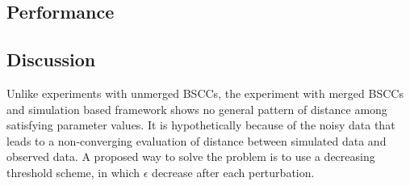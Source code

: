 \subsection{Performance}

\subsection{Discussion}
Unlike experiments with unmerged BSCCs, the experiment with merged BSCCs and simulation based
framework shows no general pattern of distance among satisfying parameter values. It is
hypothetically because of the noisy data that leads to a non-converging evaluation of distance
between simulated data and observed data. A proposed way to solve the problem is to use a decreasing
threshold scheme, in which $\epsilon$ decrease after each perturbation.

